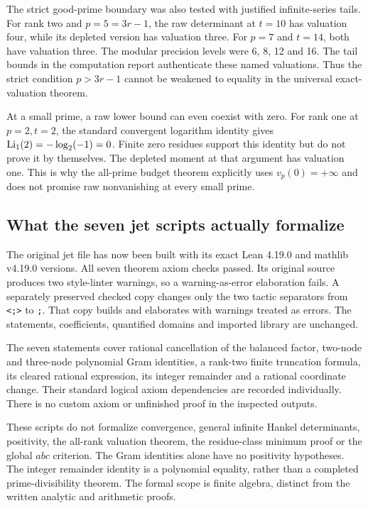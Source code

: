 The strict good-prime boundary was also tested with justified infinite-series tails. For rank two and $p=5=3r-1$, the raw determinant at $t=10$ has valuation four, while its depleted version has valuation three. For $p=7$ and $t=14$, both have valuation three. The modular precision levels were 6, 8, 12 and 16. The tail bounds in the computation report authenticate these named valuations. Thus the strict condition $p>3r-1$ cannot be weakened to equality in the universal exact-valuation theorem.

At a small prime, a raw lower bound can even coexist with zero. For rank one at $p=2,t=2$, the standard convergent logarithm identity gives $\operatorname{Li}_1(2)=-\log_2(-1)=0$. Finite zero residues support this identity but do not prove it by themselves. The depleted moment at that argument has valuation one. This is why the all-prime budget theorem explicitly uses $v_p(0)=+\infty$ and does not promise raw nonvanishing at every small prime.

\subsection{What the seven jet scripts actually formalize}
The original jet file has now been built with its exact Lean 4.19.0 and mathlib v4.19.0 versions. All seven theorem axiom checks passed. Its original source produces two style-linter warnings, so a warning-as-error elaboration fails. A separately preserved checked copy changes only the two tactic separators from \texttt{<;>} to \texttt{;}. That copy builds and elaborates with warnings treated as errors. The statements, coefficients, quantified domains and imported library are unchanged.

The seven statements cover rational cancellation of the balanced factor, two-node and three-node polynomial Gram identities, a rank-two finite truncation formula, its cleared rational expression, its integer remainder and a rational coordinate change. Their standard logical axiom dependencies are recorded individually. There is no custom axiom or unfinished proof in the inspected outputs.

These scripts do not formalize convergence, general infinite Hankel determinants, positivity, the all-rank valuation theorem, the residue-class minimum proof or the global $abc$ criterion. The Gram identities alone have no positivity hypotheses. The integer remainder identity is a polynomial equality, rather than a completed prime-divisibility theorem. The formal scope is finite algebra, distinct from the written analytic and arithmetic proofs.

